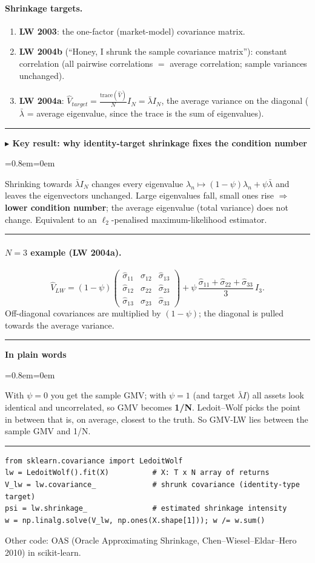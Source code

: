 \documentclass[11pt,a4paper]{report}
\newenvironment{notebox}[1]
  {\par\medskip\Needspace{6\baselineskip}\noindent\rule{\linewidth}{0.4pt}\par\nopagebreak
   \noindent\textbf{#1}\par\nopagebreak
   \begin{list}{}{\leftmargin=0.8em\rightmargin=0em\topsep=2pt}\item[]}
  {\end{list}\nopagebreak\noindent\rule{\linewidth}{0.4pt}\par\medskip}
\newenvironment{keybox}[1][]{\begin{notebox}{$\blacktriangleright$ Key result#1}}{\end{notebox}}
\newenvironment{plainbox}{\begin{notebox}{In plain words}}{\end{notebox}}
\begin{document}
\paragraph{Shrinkage targets.}
\begin{enumerate}
  \item \textbf{LW 2003}: the one-factor (market-model) covariance matrix.
  \item \textbf{LW 2004b} (``Honey, I shrunk the sample covariance matrix''): constant correlation
    (all pairwise correlations $=$ average correlation; sample variances unchanged).
  \item \textbf{LW 2004a}: $\hat V_{target}=\frac{\text{trace}(\hat V)}{N}I_N=\bar\lambda I_N$,
    the average variance on the diagonal ($\bar\lambda$ = average eigenvalue, since the trace is the sum of eigenvalues).
\end{enumerate}
\begin{keybox}[: why identity-target shrinkage fixes the condition number]
Shrinking towards $\bar\lambda I_N$ changes every eigenvalue
$\lambda_n\mapsto(1-\psi)\lambda_n+\psi\bar\lambda$ and leaves the eigenvectors unchanged.
Large eigenvalues fall, small ones rise $\Rightarrow$ \textbf{lower condition number};
the average eigenvalue (total variance) does not change. Equivalent to an
$\ell_2$-penalised maximum-likelihood estimator.
\end{keybox}
\paragraph{$N=3$ example (LW 2004a).}
\[
\hat V_{LW}=(1-\psi)\begin{pmatrix}\hat\sigma_{11}&\hat\sigma_{12}&\hat\sigma_{13}\\\hat\sigma_{12}&\hat\sigma_{22}&\hat\sigma_{23}\\\hat\sigma_{13}&\hat\sigma_{23}&\hat\sigma_{33}\end{pmatrix}
+\psi\,\frac{\hat\sigma_{11}+\hat\sigma_{22}+\hat\sigma_{33}}{3}\,I_3 .
\]
Off-diagonal covariances are multiplied by $(1-\psi)$; the diagonal is pulled towards the average variance.
\begin{plainbox}
With $\psi=0$ you get the sample GMV; with $\psi=1$ (and target $\bar\lambda I$) all
assets look identical and uncorrelated, so GMV becomes \textbf{1/N}. Ledoit--Wolf
picks the point in between that is, on average, closest to the truth. So GMV-LW
lies between the sample GMV and 1/N.
\end{plainbox}
\begin{lstlisting}
from sklearn.covariance import LedoitWolf
lw = LedoitWolf().fit(X)          # X: T x N array of returns
V_lw = lw.covariance_             # shrunk covariance (identity-type target)
psi = lw.shrinkage_               # estimated shrinkage intensity
w = np.linalg.solve(V_lw, np.ones(X.shape[1])); w /= w.sum()
\end{lstlisting}
Other code: OAS (Oracle Approximating Shrinkage, Chen--Wiesel--Eldar--Hero 2010) in scikit-learn.
\end{document}
